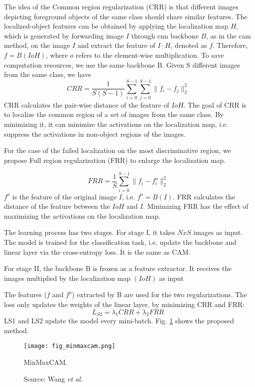 The idea of the Common region regularization (CRR) is that different images depicting foreground objects of the same class should share similar features. The localized-object features can be obtained by applying the localization map $H$, which is generated by forwarding image $I$ through \acrshort{cnn} backbone $B$, as in the \acrshort{cam} method, on the image $I$ and extract the feature of $I \cdot H$, denoted as $f$. Therefore, $f=B(I o H)$, where $o$ refers to the element-wise multiplication. To save computation resources, we use the same backbone B. Given S different images from the same class, we have 
\begin{equation}
    CRR = \frac{1}{S(S-1)} \sum^{S-1}_{i=0} \sum^{S-1}_{j=0} \lVert f_i - f_j \rVert^2_2
\end{equation}
CRR calculates the pair-wise distance of the feature of $IoH$. The goal of CRR is to localize the common region of a set of images from the same class. By minimizing it, it can minimize the activations on the localization map, i.e. suppress the activations in non-object regions of the images.

For the case of the failed localization on the most discriminative region, we propose Full region regularization (FRR) to enlarge the localization map.

\begin{equation}
    FRR = \frac{1}{S} \sum^{S-1}_{i=0}\lVert f_i - f^o_i \rVert^2_2
\end{equation}
$f^o$ is the feature of the original image $I$, i.e. $f^o=B(I)$. FRR calculates the distance of the feature between the $IoH$ and $I$. Minimizing FRR has the effect of maximizing the activations on the localization map.

The learning process has two stages. For stage I, it takes $N x S$ images as input. The model is trained for the classification task, i.e. update the backbone and linear layer via the cross-entropy loss. It is the same as CAM.

For stage II, the backbone B is frozen as a feature extractor. It receives the images multiplied by the localization map $(IoH)$ as input

The features ($f$ and $f^o$) extracted by B are used for the two regularizations. The loss only updates the weights of the linear layer, by minimizing CRR and FRR:
\begin{equation}
    L_{S2} = \lambda_{1}CRR + \lambda_{2}FRR
\end{equation} 
LS1 and LS2 update the model every mini-batch. Fig. \ref{fig:minmaxcam} shows the proposed method.
\begin{figure}[ht]
    \begin{center}       
    \texttt{[image: fig\_minmaxcam.png]}
    \caption[MinMaxCAM]{MinMaxCAM.}
    \caption*{Source: Wang \textit{et al.} \cite{wang2021minmaxcam}}
    \label{fig:minmaxcam}
    \end{center}
\end{figure}


